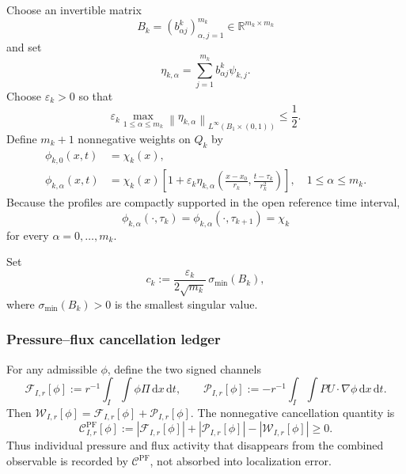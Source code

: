 \documentclass[11pt]{article}
\numberwithin{equation}{section}
\newcommand{\R}{\mathbb R}
\newcommand{\eps}{\varepsilon}
\newcommand{\dxdt}{\,\mathrm dx\,\mathrm dt}
\newcommand{\norm}[2]{\left\lVert #1\right\rVert_{#2}}
\newcommand{\abs}[1]{\left\lvert #1\right\rvert}
\newcommand{\W}{\mathcal W}
\newcommand{\Cpf}{\mathcal C^{\mathrm{PF}}}
\begin{document}
Choose an invertible matrix
\begin{equation}\label{eq:Bmatrix}
B_k=(b^k_{\alpha j})_{\alpha,j=1}^{m_k}
\in\R^{m_k\times m_k}
\end{equation}
and set
\begin{equation}\label{eq:eta-alpha}
\eta_{k,\alpha}
=
\sum_{j=1}^{m_k}b^k_{\alpha j}\psi_{k,j}.
\end{equation}
Choose \(\eps_k>0\) so that
\begin{equation}\label{eq:eps-positive}
\eps_k\max_{1\le\alpha\le m_k}
\norm{\eta_{k,\alpha}}{L^\infty(B_1\times(0,1))}
\le\frac12.
\end{equation}
Define \(m_k+1\) nonnegative weights on \(Q_k\) by
\begin{align}
\phi_{k,0}(x,t)&=\chi_k(x),
\label{eq:phi0}
\\
\phi_{k,\alpha}(x,t)
&=
\chi_k(x)
\left[
1+\eps_k\eta_{k,\alpha}\left(
\frac{x-x_0}{r_k},
\frac{t-\tau_k}{r_k^2}
\right)
\right],
\quad 1\le\alpha\le m_k.
\label{eq:phialpha}
\end{align}
Because the profiles are compactly supported in the open reference time interval,
\begin{equation}\label{eq:common-endpoints}
\phi_{k,\alpha}(\cdot,\tau_k)
=
\phi_{k,\alpha}(\cdot,\tau_{k+1})
=
\chi_k
\end{equation}
for every \(\alpha=0,\ldots,m_k\).

Set
\begin{equation}\label{eq:ck}
c_k
:=
\frac{\eps_k}{2\sqrt{m_k}}\,
\sigma_{\min}(B_k),
\end{equation}
where \(\sigma_{\min}(B_k)>0\) is the smallest singular value.

\subsubsection{Pressure--flux cancellation ledger}

For any admissible \(\phi\), define the two signed channels
\begin{equation}\label{eq:channels}
\mathcal F_{I,r}[\phi]
:=
r^{-1}\int_I\int\phi\Pi\dxdt,
\qquad
\mathcal P_{I,r}[\phi]
:=
-r^{-1}\int_I\int PU\cdot\nabla\phi\dxdt.
\end{equation}
Then \(\W_{I,r}[\phi]=\mathcal F_{I,r}[\phi]+\mathcal P_{I,r}[\phi]\). The nonnegative cancellation quantity is
\begin{equation}\label{eq:cancellation}
\Cpf_{I,r}[\phi]
:=
\abs{\mathcal F_{I,r}[\phi]}
+
\abs{\mathcal P_{I,r}[\phi]}
-
\abs{\W_{I,r}[\phi]}
\ge0.
\end{equation}
Thus individual pressure and flux activity that disappears from the combined observable is recorded by \(\Cpf\), not absorbed into localization error.
\end{document}
